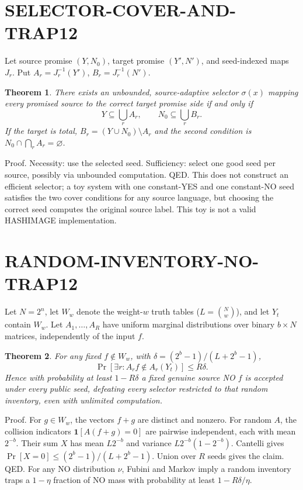 \documentclass[11pt]{article}
\newtheorem{theorem}{Theorem}
\begin{document}
\section*{SELECTOR-COVER-AND-TRAP12}
Let source promise $(Y,N_0)$, target promise $(Y',N')$, and seed-indexed maps $J_r$. Put $A_r=J_r^{-1}(Y')$, $B_r=J_r^{-1}(N')$.
\begin{theorem}
There exists an unbounded, source-adaptive selector $\sigma(x)$ mapping every promised source to the correct target promise side if and only if
\[
Y\subseteq\bigcup_r A_r,\qquad N_0\subseteq\bigcup_r B_r.
\]
If the target is total, $B_r=(Y\cup N_0)\setminus A_r$ and the second condition is $N_0\cap\bigcap_r A_r=\varnothing$.
\end{theorem}
\noindent Proof. Necessity: use the selected seed. Sufficiency: select one good seed per source, possibly via unbounded computation. QED. This does not construct an efficient selector; a toy system with one constant-YES and one constant-NO seed satisfies the two cover conditions for any source language, but choosing the correct seed computes the original source label. This toy is not a valid HASHIMAGE implementation.

\section*{RANDOM-INVENTORY-NO-TRAP12}
Let $N=2^n$, let $W_w$ denote the weight-$w$ truth tables ($L=\binom Nw$), and let $Y_t$ contain $W_w$. Let $A_1,\ldots,A_R$ have uniform marginal distributions over binary $b\times N$ matrices, independently of the input $f$.
\begin{theorem}
For any fixed $f\notin W_w$, with $\delta=(2^b-1)/(L+2^b-1)$,
\[
\Pr[\exists r:A_rf\notin A_r(Y_t)]\le R\delta.
\]
Hence with probability at least $1-R\delta$ a fixed genuine source NO $f$ is accepted under every public seed, defeating every selector restricted to that random inventory, even with unlimited computation.
\end{theorem}
\noindent Proof. For $g\in W_w$, the vectors $f+g$ are distinct and nonzero. For random $A$, the collision indicators $\mathbf1[A(f+g)=0]$ are pairwise independent, each with mean $2^{-b}$. Their sum $X$ has mean $L2^{-b}$ and variance $L2^{-b}(1-2^{-b})$. Cantelli gives $\Pr[X=0]\le(2^b-1)/(L+2^b-1)$. Union over $R$ seeds gives the claim. QED. For any NO distribution $\nu$, Fubini and Markov imply a random inventory traps a $1-\eta$ fraction of NO mass with probability at least $1-R\delta/\eta$.
\end{document}
